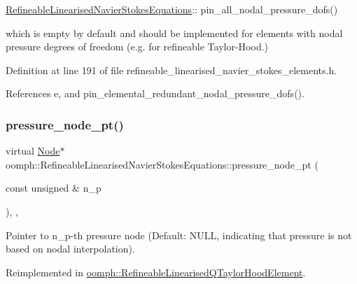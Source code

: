 \begin{DoxyItemize}
\item {\ttfamily \hyperlink{classoomph_1_1RefineableLinearisedNavierStokesEquations}{Refineable\+Linearised\+Navier\+Stokes\+Equations}\+:}\+: pin\+\_\+all\+\_\+nodal\+\_\+pressure\+\_\+dofs()
\end{DoxyItemize}which is empty by default and should be implemented for elements with nodal pressure degrees of freedom (e.\+g. for refineable Taylor-\/\+Hood.) 

Definition at line 191 of file refineable\+\_\+linearised\+\_\+navier\+\_\+stokes\+\_\+elements.\+h.



References e, and pin\+\_\+elemental\+\_\+redundant\+\_\+nodal\+\_\+pressure\+\_\+dofs().

\mbox{\label{classoomph_1_1RefineableLinearisedNavierStokesEquations_abb2f7a5ecb5695a12d44929a8ffe822b}} 
\subsubsection{\texorpdfstring{pressure\+\_\+node\+\_\+pt()}{pressure\_node\_pt()}}
{\footnotesize\ttfamily virtual \hyperlink{classoomph_1_1Node}{Node}$\ast$ oomph\+::\+Refineable\+Linearised\+Navier\+Stokes\+Equations\+::pressure\+\_\+node\+\_\+pt (\begin{DoxyParamCaption}\item[{const unsigned \&}]{n\+\_\+p }\end{DoxyParamCaption})\hspace{0.3cm}{\ttfamily [inline]}, {\ttfamily [protected]}, {\ttfamily [virtual]}}



Pointer to n\+\_\+p-\/th pressure node (Default\+: N\+U\+LL, indicating that pressure is not based on nodal interpolation). 



Reimplemented in \hyperlink{classoomph_1_1RefineableLinearisedQTaylorHoodElement_a547bdaeae9d032bfe65d19a7e538dc42}{oomph\+::\+Refineable\+Linearised\+Q\+Taylor\+Hood\+Element}.



